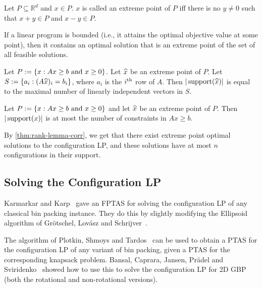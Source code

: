 \begin{definition}
Let $P \subseteq \mathbb{R}^d$ and $x \in P$.
$x$ is called an extreme point of $P$ iff there is no $y \neq 0$
such that $x + y \in P$ and $x - y \in P$.
\end{definition}
\begin{lemma}
If a linear program is bounded (i.e., it attains the optimal objective value at some point),
then it contains an optimal solution that is an extreme point of the set of all feasible solutions.
\end{lemma}
\begin{lemma}
Let $P := \{x: Ax \ge b \textrm{ and } x \ge 0\}$. Let $\widehat{x}$ be an extreme point of $P$.
Let $S := \{a_i: (A\widehat{x})_i = b_i\}$, where $a_i$ is the $i^{\textrm{th}}$ row of $A$.
Then $|\operatorname{support}(\widehat{x})|$ is equal to the maximal number of linearly independent vectors in $S$.
\end{lemma}
\begin{corollary}
\label{thm:rank-lemma-corr}
Let $P := \{x: Ax \ge b \textrm{ and } x \ge 0\}$ and let $\widehat{x}$ be an extreme point of $P$.
Then $|\operatorname{support}(x)|$ is at most the number of constraints in $Ax \ge b$.
\end{corollary}
By \cref{thm:rank-lemma-corr}, we get that there exist extreme point optimal solutions
to the configuration LP, and these solutions have at most $n$ configurations in their support.

\subsection{Solving the Configuration LP}

Karmarkar and Karp~\cite{karmarkar-karp} gave an FPTAS for solving the configuration LP
of any classical bin packing instance.
They do this by slightly modifying the Ellipsoid algorithm of
Gr\"otschel, Lov\'asz and Schrijver~\cite{gls-ellipsoid}.

The algorithm of Plotkin, Shmoys and Tardos~\cite{plotkin1995fast} can be used to
obtain a PTAS for the configuration LP of any variant of bin packing,
given a PTAS for the corresponding knapsack problem.
Bansal, Caprara, Jansen, Pr\"adel and Sviridenko~\cite{bansal2009structural}
showed how to use this to solve the configuration LP for 2D GBP
(both the rotational and non-rotational versions).
